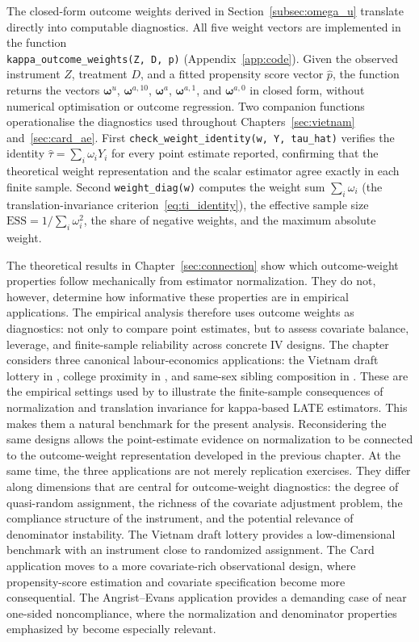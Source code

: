 \documentclass[12pt, a4paper, oneside]{article}
\theoremstyle{plain}
\theoremstyle{definition}
\begin{document}
The closed-form outcome weights derived in
Section~\ref{subsec:omega_u}  translate directly
into computable diagnostics. All five weight vectors are implemented in the
function\\ \texttt{kappa\_outcome\_weights(Z, D, p)} (Appendix~\ref{app:code}). Given the observed
instrument $Z$, treatment $D$, and a fitted propensity score vector $\hat{p}$,
the function returns the vectors $\boldsymbol{\omega}^u$,
$\boldsymbol{\omega}^{a,10}$, $\boldsymbol{\omega}^a$,
$\boldsymbol{\omega}^{a,1}$, and $\boldsymbol{\omega}^{a,0}$ in closed form,
without numerical optimisation or outcome regression.
Two companion functions operationalise the diagnostics used throughout
Chapters~\ref{sec:vietnam} and~\ref{sec:card_ae}. First
\texttt{check\_weight\_identity(w, Y, tau\_hat)} verifies the identity
$\hat\tau = \sum_i \omega_i Y_i$ 
for every point estimate
reported, confirming that the theoretical weight representation and the
scalar estimator agree exactly in each finite sample. Second
\texttt{weight\_diag(w)} computes the weight sum $\sum_i \omega_i$ (the translation-invariance criterion~\eqref{eq:ti_identity}), the effective sample size
$\mathrm{ESS} = 1/\!\sum_i \omega_i^2$, the share of negative weights, and
the maximum absolute weight.
\bigskip

The theoretical results in Chapter~\ref{sec:connection} show which outcome-weight properties follow mechanically from estimator normalization. They do not, however, determine how informative these properties are in empirical applications. The empirical analysis therefore uses outcome weights as diagnostics: not only to compare point estimates, but to assess covariate balance, leverage, and finite-sample reliability across concrete IV designs.
The chapter considers three canonical labour-economics applications: the Vietnam draft lottery in \citet{angrist1990lifetime}, college proximity in \citet{card1995}, and same-sex sibling composition in \citet{angrist1998}. These are the empirical settings used by \citet{sloczynski2025abadie} to illustrate the finite-sample consequences of normalization and translation invariance for kappa-based LATE estimators. This makes them a natural benchmark for the present analysis. Reconsidering the same designs allows the point-estimate evidence on normalization to be connected to the outcome-weight representation developed in the previous chapter.
At the same time, the three applications are not merely replication exercises. They differ along dimensions that are central for outcome-weight diagnostics: the degree of quasi-random assignment, the richness of the covariate adjustment problem, the compliance structure of the instrument, and the potential relevance of denominator instability. The Vietnam draft lottery provides a low-dimensional benchmark with an instrument close to randomized assignment. The Card application moves to a more covariate-rich observational design, where propensity-score estimation and covariate specification become more consequential. The Angrist--Evans application provides a demanding case of near one-sided noncompliance, where the normalization and denominator properties emphasized by \citet{sloczynski2025abadie} become especially relevant.
\end{document}

